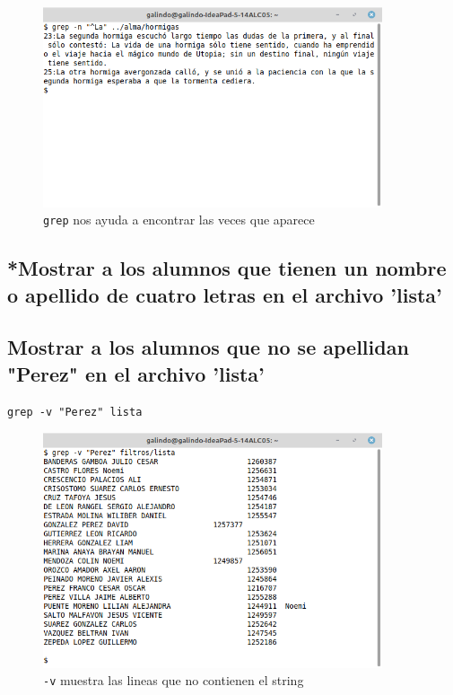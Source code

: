 \documentclass[11pt]{article}
\begin{document}
\begin{figure}[htbp]
\centering
\includegraphics[width=10cm]{img/a19.png}
\caption[\texttt{grep}]{\texttt{grep} nos ayuda a encontrar las veces que aparece}
\end{figure}

\pagebreak

\subsection{*Mostrar a los alumnos que tienen un nombre o apellido de cuatro letras en el archivo 'lista'}
\label{sec:orgf187978}
\subsection{Mostrar a los alumnos que no se apellidan "Perez" en el archivo 'lista'}
\label{sec:org01dff0a}
\begin{verbatim}
grep -v "Perez" lista
\end{verbatim}

\begin{figure}[htbp]
\centering
\includegraphics[width=10cm]{img/21.png}
\caption[\texttt{-v}]{\texttt{-v} muestra las lineas que no contienen el string}
\end{figure}
\end{document}
